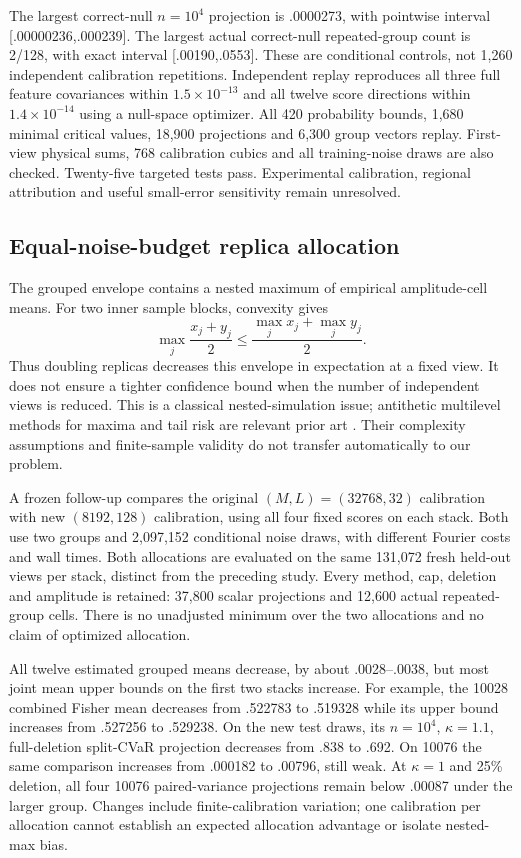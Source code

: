 The largest correct-null $n=10^4$ projection is .0000273, with pointwise
interval [.00000236,.000239]. The largest actual correct-null repeated-group
count is 2/128, with exact interval [.00190,.0553]. These are conditional
controls, not 1,260 independent calibration repetitions. Independent replay
reproduces all three full feature covariances within $1.5\times10^{-13}$
and all twelve score directions within $1.4\times10^{-14}$ using a
null-space optimizer. All 420 probability bounds, 1,680 minimal critical
values, 18,900 projections and 6,300 group vectors replay. First-view physical
sums, 768 calibration cubics and all training-noise draws are also checked.
Twenty-five targeted tests pass. Experimental calibration, regional
attribution and useful small-error sensitivity remain unresolved.

\subsection{Equal-noise-budget replica allocation}
The grouped envelope contains a nested maximum of empirical amplitude-cell
means. For two inner sample blocks, convexity gives
\[
 \max_j\frac{x_j+y_j}{2}\le\frac{\max_j x_j+\max_j y_j}{2}.
\]
Thus doubling replicas decreases this envelope in expectation at a fixed view.
It does not ensure a tighter confidence bound when the number of independent
views is reduced. This is a classical nested-simulation issue; antithetic
multilevel methods for maxima and tail risk are relevant prior art
\citep{gilesgoda2018,gileshajiali2019}. Their complexity assumptions and
finite-sample validity do not transfer automatically to our problem.

A frozen follow-up compares the original $(M,L)=(32768,32)$ calibration
with new $(8192,128)$ calibration, using all four fixed scores on each stack.
Both use two groups and 2,097,152 conditional noise draws, with different
Fourier costs and wall times. Both allocations are evaluated on the same
131,072 fresh held-out views per stack, distinct from the preceding study.
Every method, cap, deletion and amplitude is retained: 37,800 scalar
projections and 12,600 actual repeated-group cells. There is no unadjusted
minimum over the two allocations and no claim of optimized allocation.

All twelve estimated grouped means decrease, by about .0028--.0038, but
most joint mean upper bounds on the first two stacks increase. For example,
the 10028 combined Fisher mean decreases from .522783 to .519328 while
its upper bound increases from .527256 to .529238. On the new test draws,
its $n=10^4$, $\kappa=1.1$, full-deletion split-CVaR projection decreases
from .838 to .692. On 10076 the same comparison increases from .000182
to .00796, still weak. At $\kappa=1$ and 25\% deletion, all four 10076
paired-variance projections remain below .00087 under the larger group.
Changes include finite-calibration variation; one calibration per allocation
cannot establish an expected allocation advantage or isolate nested-max bias.

